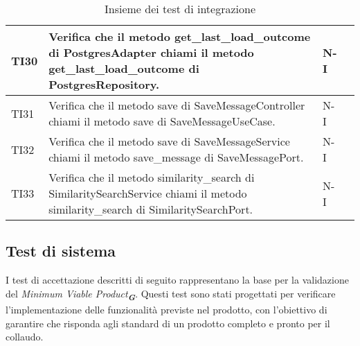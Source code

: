 \begin{table}[h!]
\begin{tabularx}{\textwidth}{|p{}|X|p{}|p{}|}
    TI30 & Verifica che il metodo get\_last\_load\_outcome di PostgresAdapter chiami il metodo get\_last\_load\_outcome di PostgresRepository. &  N-I \\ \hline
    TI31 & Verifica che il metodo save di SaveMessageController chiami il metodo save di SaveMessageUseCase. &  N-I \\ \hline
    TI32 & Verifica che il metodo save di SaveMessageService chiami il metodo save\_message di SaveMessagePort. &  N-I \\ \hline
    TI33 & Verifica che il metodo similarity\_search di SimilaritySearchService chiami il metodo similarity\_search di SimilaritySearchPort. &  N-I \\ \hline
    \end{tabularx}
    \caption{Insieme dei test di integrazione}
\end{table}

\newpage

\subsection{Test di sistema}
\label{sec:Test di sistema}
I test di accettazione descritti di seguito rappresentano la base per la validazione del \emph{Minimum Viable Product}\textsubscript{\textit{\textbf{G}}}. Questi test sono stati progettati per verificare l’implementazione delle funzionalità previste nel prodotto, con l’obiettivo di garantire che risponda agli standard di un prodotto completo e pronto per il collaudo.

